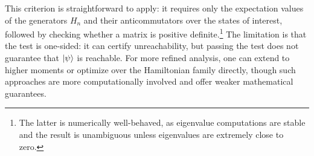 \documentclass[aps,prx,reprint,superscriptaddress,footnote, twocolumn,notitlepage]{revtex4-2}
\begin{document}
This criterion is straightforward to apply: it requires only the expectation values of the generators $H_n$ and their anticommutators over the states of interest, followed by checking whether a matrix is positive definite.\footnote{The latter is numerically well-behaved, as eigenvalue computations are stable and the result is unambiguous unless eigenvalues are extremely close to zero.} The limitation is that the test is one-sided: it can certify unreachability, but passing the test does not guarantee that $\ket{\psi}$ is reachable. For more refined analysis, one can extend to higher moments or optimize over the Hamiltonian family directly, though such approaches are more computationally involved and offer weaker mathematical guarantees.

\end{document}
